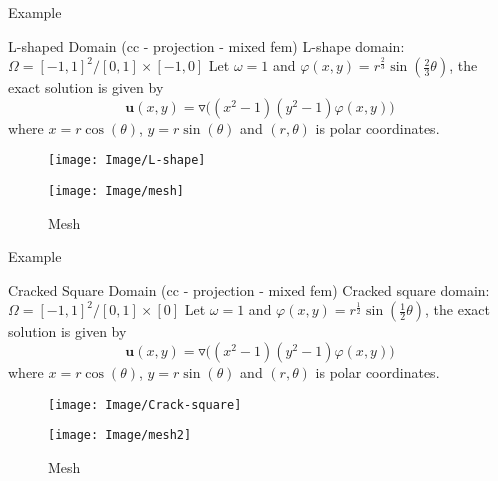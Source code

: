 \documentclass[13pt]{beamer}
\begin{document}
\begin{frame}[t]{Example}
   \begin{block}{L-shaped Domain (cc - projection - mixed fem)}
     L-shape domain: $\Omega = [-1,1]^2/[0,1]\times[-1,0]$
     Let $\omega = 1$ and $\varphi(x,y) = r^{\frac{2}{3}}\sin(\frac{2}{3}\theta)$, the exact solution is given by\\[-2ex]
     \[\mathbf{u}(x,y) = \triangledown\big((x^2 - 1)(y^2 - 1)\varphi(x,y)\big)\]
     where $x = r\cos(\theta)$, $y = r\sin(\theta)$ and $(r,\theta)$ is  polar coordinates. \\[-1ex]
     \begin{figure}[bhpt]
         \hspace{-1.pt}
         \begin{minipage}[b]{0.5 \textwidth}
          \centering
          \texttt{[image: Image/L-shape]}\\
          \caption{L-shape domain}\label{fig:L-shape}
        \end{minipage}
        \hspace{-1.in}
        \begin{minipage}[b]{0.5 \textwidth}
          \centering
          \texttt{[image: Image/mesh]}\\
          \caption{Mesh}\label{fig:mesh}
        \end{minipage}
     \end{figure}
   \end{block}
\end{frame}

\begin{frame}[t]{Example}
   \begin{block}{Cracked Square Domain (cc - projection - mixed fem)}
     Cracked square domain: $\Omega = [-1,1]^2/[0,1]\times[0]$
     Let $\omega = 1$ and $\varphi(x,y) = r^{\frac{1}{2}}\sin(\frac{1}{2}\theta)$, the exact solution is given by\\[-2ex]
     \[\mathbf{u}(x,y) = \triangledown\big((x^2 - 1)(y^2 - 1)\varphi(x,y)\big)\]
     where $x = r\cos(\theta)$, $y = r\sin(\theta)$ and $(r,\theta)$ is  polar coordinates. \\[-1ex]
     \begin{figure}[bhpt]
         \hspace{-1.pt}
         \begin{minipage}[b]{0.5 \textwidth}
          \centering
          \texttt{[image: Image/Crack-square]}\\
          \caption{Cracked square domain}\label{fig:L-shape}
        \end{minipage}
        \hspace{-0.6in}
        \begin{minipage}[b]{0.5 \textwidth}
          \centering
          \texttt{[image: Image/mesh2]}\\
          \caption{Mesh}\label{fig:mesh2}
        \end{minipage}
     \end{figure}
   \end{block}
\end{frame}
\end{document}
